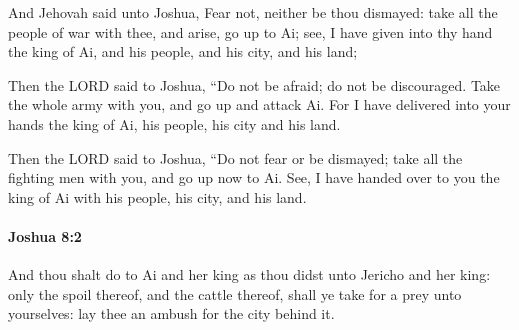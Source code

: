 			\begin{versebox}
					\item[BHS] 
					\item[ASV] And Jehovah said unto Joshua, Fear not, neither be thou dismayed: take all the people of war with thee, and arise, go up to Ai; see, I have given into thy hand the king of Ai, and his people, and his city, and his land;
					\item[NIV] Then the LORD said to Joshua, “Do not be afraid; do not be discouraged. Take the whole army with you, and go up and attack Ai. For I have delivered into your hands the king of Ai, his people, his city and his land.
					\item[NRSV] Then the LORD said to Joshua, “Do not fear or be dismayed; take all the fighting men with you, and go up now to Ai. See, I have handed over to you the king of Ai with his people, his city, and his land.
			\end{versebox}

		\paragraph{Joshua 8:2} %
			\label{JOSHUA-8-2}

			And thou shalt do to Ai and her king as thou didst unto Jericho and her king: only the spoil thereof, and the cattle thereof, shall ye take for a prey unto yourselves: lay thee an ambush for the city behind it.

